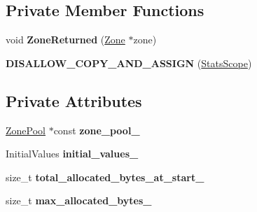 \subsection*{Private Member Functions}
\begin{DoxyCompactItemize}
\item 
void {\bfseries Zone\+Returned} (\hyperlink{classv8_1_1internal_1_1_zone}{Zone} $\ast$zone)\hypertarget{classv8_1_1internal_1_1compiler_1_1_zone_pool_1_1_stats_scope_a1a8ff071f6ae0fc9818b7f1ef59fa000}{}\label{classv8_1_1internal_1_1compiler_1_1_zone_pool_1_1_stats_scope_a1a8ff071f6ae0fc9818b7f1ef59fa000}

\item 
{\bfseries D\+I\+S\+A\+L\+L\+O\+W\+\_\+\+C\+O\+P\+Y\+\_\+\+A\+N\+D\+\_\+\+A\+S\+S\+I\+GN} (\hyperlink{classv8_1_1internal_1_1compiler_1_1_zone_pool_1_1_stats_scope}{Stats\+Scope})\hypertarget{classv8_1_1internal_1_1compiler_1_1_zone_pool_1_1_stats_scope_a3620d64b77f4c45e541f04828ca9a6ac}{}\label{classv8_1_1internal_1_1compiler_1_1_zone_pool_1_1_stats_scope_a3620d64b77f4c45e541f04828ca9a6ac}

\end{DoxyCompactItemize}
\subsection*{Private Attributes}
\begin{DoxyCompactItemize}
\item 
\hyperlink{classv8_1_1internal_1_1compiler_1_1_zone_pool}{Zone\+Pool} $\ast$const {\bfseries zone\+\_\+pool\+\_\+}\hypertarget{classv8_1_1internal_1_1compiler_1_1_zone_pool_1_1_stats_scope_a6118ce6ba72252e2f606261b31906c16}{}\label{classv8_1_1internal_1_1compiler_1_1_zone_pool_1_1_stats_scope_a6118ce6ba72252e2f606261b31906c16}

\item 
Initial\+Values {\bfseries initial\+\_\+values\+\_\+}\hypertarget{classv8_1_1internal_1_1compiler_1_1_zone_pool_1_1_stats_scope_aae673c938cfad689ed98ecb44bb62951}{}\label{classv8_1_1internal_1_1compiler_1_1_zone_pool_1_1_stats_scope_aae673c938cfad689ed98ecb44bb62951}

\item 
size\+\_\+t {\bfseries total\+\_\+allocated\+\_\+bytes\+\_\+at\+\_\+start\+\_\+}\hypertarget{classv8_1_1internal_1_1compiler_1_1_zone_pool_1_1_stats_scope_a69a44471db3294972900d7c10c6b233a}{}\label{classv8_1_1internal_1_1compiler_1_1_zone_pool_1_1_stats_scope_a69a44471db3294972900d7c10c6b233a}

\item 
size\+\_\+t {\bfseries max\+\_\+allocated\+\_\+bytes\+\_\+}\hypertarget{classv8_1_1internal_1_1compiler_1_1_zone_pool_1_1_stats_scope_a89df55e36212359bb25af13ff89e08cf}{}\label{classv8_1_1internal_1_1compiler_1_1_zone_pool_1_1_stats_scope_a89df55e36212359bb25af13ff89e08cf}

\end{DoxyCompactItemize}
